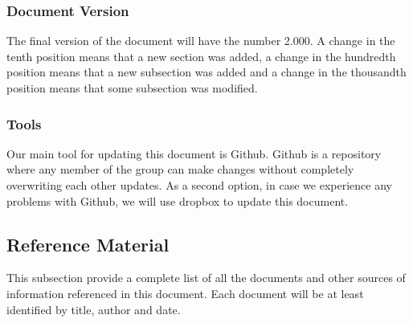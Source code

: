 \documentclass[12pt]{article}
\begin{document}
\subsubsection{Document Version}
The final version of the document will have the number 2.000. A change in the tenth position means that a new section was added, a change in the hundredth position means that a new subsection was added and a change in the thousandth position means that some subsection was modified.

\subsubsection{Tools}
Our main tool for updating this document is Github. Github is a repository where any member of the group can make changes without completely overwriting each other updates. As a second option, in case we experience any problems with Github, we will use dropbox to update this document.

\subsection{Reference Material}
This subsection provide a complete list of all the documents and other sources of information referenced in this document. Each document will be at least identified by title, author and date.
\end{document}
